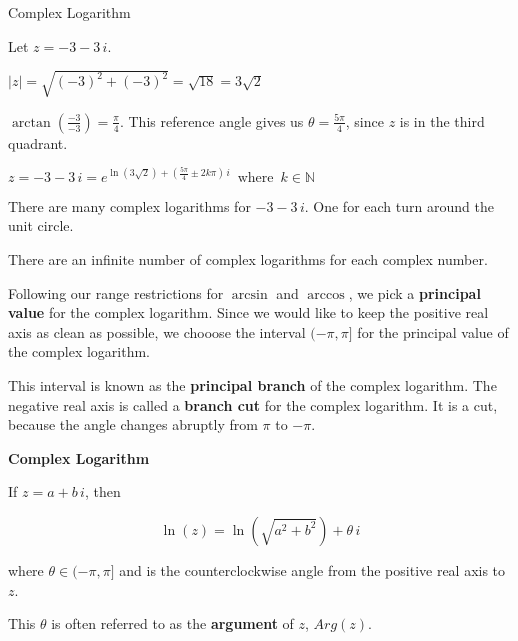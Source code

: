 \documentclass{ximera}
\begin{document}
\begin{example} Complex Logarithm


Let $z = -3 - 3 \, i$.


$|z| = \sqrt{(-3)^2 + (-3)^2} =  \sqrt{18} = 3 \sqrt{2}$


$\arctan\left(\frac{-3}{-3}\right) = \frac{\pi}{4}$.  This reference angle gives us $\theta = \frac{5 \pi}{4}$, since $z$ is in the third quadrant.




$z = -3 - 3 \, i =  e^{\ln(3 \sqrt{2}) + \left( \tfrac{5 \pi}{4} \pm 2 k \pi \right) \, i}     \, \text{ where } \, k \in \mathbb{N}  $


There are many complex logarithms for $-3 - 3 \, i$. One for each turn around the unit circle.



\end{example}




There are an infinite number of complex logarithms for each complex number.


Following our range restrictions for $\arcsin$ and $\arccos$, we pick a \textbf{principal value} for the complex logarithm. Since we would like to keep the positive real axis as clean as possible, we chooose the interval $(-\pi, \pi]$ for the principal value of the complex logarithm.

This interval is known as the \textbf{principal branch} of the complex logarithm.  The negative real axis is called a \textbf{branch cut} for the complex logarithm. It is a cut, because the angle changes abruptly from $\pi$ to $-\pi$.





\begin{definition}   \textbf{\textcolor{green!50!black}{Complex Logarithm}}
 
If $z = a + b \, i$, then 

\[   \ln(z) = \ln(\sqrt{a^2 + b^2}) + \theta \, i       \]



where $\theta \in (-\pi, \pi]$ and is the counterclockwise angle from the positive real axis to $z$.



This $\theta$ is often referred to as the \textbf{argument} of $z$, $Arg(z)$.



\end{definition}
\end{document}
